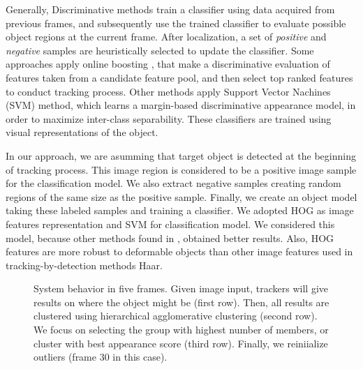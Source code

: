 Generally, Discriminative methods train a classifier using data acquired from
previous frames, and subsequently use the trained classifier to evaluate
possible object regions at the current frame. After localization, a set of
\textit{positive} and \textit{negative} samples are heuristically selected to
update the classifier. Some approaches apply online boosting
\cite{Babenko2010,Grabner2008,Grabner2006}, that make a discriminative
evaluation of features taken from a candidate feature pool, and then select top
ranked features to conduct tracking process. Other methods apply Support Vector
Nachines (SVM) method, which learns a margin-based discriminative appearance
model, in order to maximize inter-class separability. These classifiers are
trained using visual representations of the object.

In our approach, we are asumming that target object is detected at the
beginning of tracking process. This image region is considered to be a positive
image sample for the classification model. We also extract negative samples
creating random regions of the same size as the positive sample. Finally, we
create an object model taking these labeled samples and training a classifier.
We adopted HOG as image features representation and SVM for classification
model. We considered this model, because other methods found in 
\cite{zhang2014meem,Bai2013}, obtained better
results. Also, HOG features are more robust to deformable objects than other
image features used in tracking-by-detection methods \eg Haar.
\fi

\begin{figure}[t!]
\centering

    \vspace{0.15cm}


    \vspace{0.15cm}



\caption{\small System behavior in five frames. Given image input, trackers will give
results on where the object might be (first row). Then, all results are
clustered using hierarchical agglomerative clustering (second row). We focus on
selecting the group with highest number of members, or cluster with best
appearance score (third row). Finally, we reiniialize outliers
(frame 30 in this case).}   
\end{figure}

